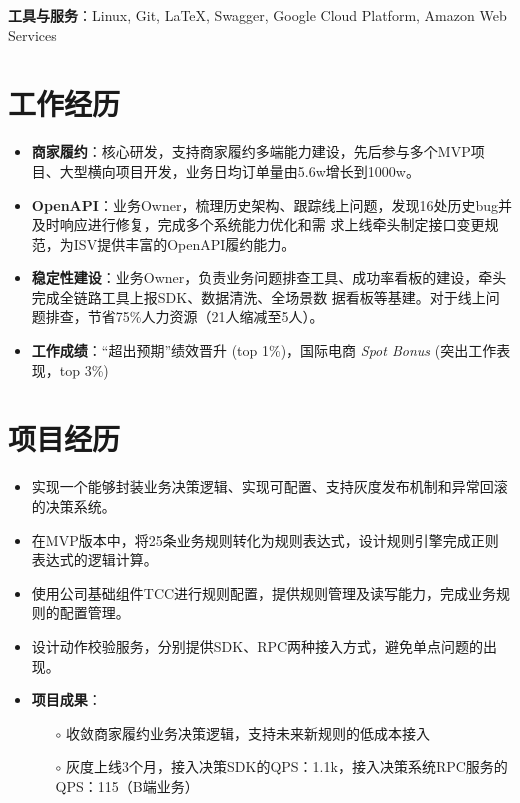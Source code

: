 \documentclass{resume}
\begin{document}
\textbf{工具与服务}：Linux, Git, \LaTeX, Swagger, Google Cloud Platform, Amazon Web Services

\section{工作经历}
\begin{itemize}[parsep=0.3ex] \normalsize
    \item \textbf{商家履约}：核心研发，支持商家履约多端能力建设，先后参与多个MVP项目、大型横向项目开发，业务日均订单量由5.6w增长到1000w。
    \item \textbf{OpenAPI}：业务Owner，梳理历史架构、跟踪线上问题，发现16处历史bug并及时响应进行修复，完成多个系统能力优化和需
    求上线牵头制定接口变更规范，为ISV提供丰富的OpenAPI履约能力。
    \item \textbf{稳定性建设}：业务Owner，负责业务问题排查工具、成功率看板的建设，牵头完成全链路工具上报SDK、数据清洗、全场景数
    据看板等基建。对于线上问题排查，节省75\%人力资源（21人缩减至5人）。
    \item \textbf{工作成绩}：“超出预期”绩效晋升 (top 1\%)，国际电商 \textit{Spot Bonus} (突出工作表现，top 3\%)
\end{itemize}

\section{项目经历}
\begin{itemize}[parsep=0.3ex] \normalsize
    \item 实现一个能够封装业务决策逻辑、实现可配置、支持灰度发布机制和异常回滚的决策系统。
    \item 在MVP版本中，将25条业务规则转化为规则表达式，设计规则引擎完成正则表达式的逻辑计算。
    \item 使用公司基础组件TCC进行规则配置，提供规则管理及读写能力，完成业务规则的配置管理。
    \item 设计动作校验服务，分别提供SDK、RPC两种接入方式，避免单点问题的出现。
    \item \textbf{项目成果}：
      \begin{itemize}
        \item[$\circ$] 收敛商家履约业务决策逻辑，支持未来新规则的低成本接入
        \item[$\circ$] 灰度上线3个月，接入决策SDK的QPS：1.1k，接入决策系统RPC服务的QPS：115（B端业务）
      \end{itemize}
\end{itemize}
\end{document}
